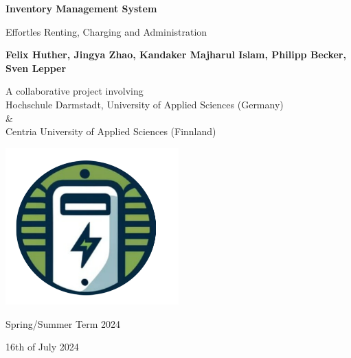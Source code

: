 \begin{titlepage}
    \begin{center}
            
        \Huge
        \textbf{Inventory Management System}
            
        \vspace{0.3cm}
        \large
        Effortles Renting, Charging and Administration
            
        \vspace{1.0cm}
            
        \textbf{
        Felix Huther,
        Jingya Zhao,
        Kandaker Majharul Islam,
        Philipp Becker,
        Sven Lepper }
          
        \vfill            
        A collaborative project involving\\
        Hochschule Darmstadt, University of Applied Sciences (Germany) \\\&\\
        Centria University of Applied Sciences (Finnland)

        \vspace{0.5cm}
            
        \includegraphics[width=0.5\textwidth]{images/logo.png}

            
        \Large
      
        Spring/Summer Term 2024\cite{samiullah_fastapi_tutorial}

        \small
        16th of July 2024
            
    \end{center}
\end{titlepage}

